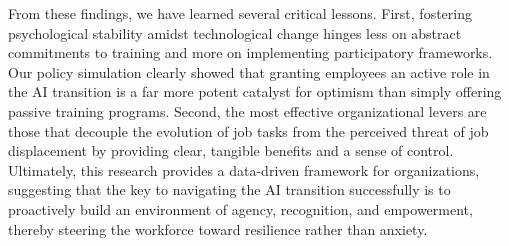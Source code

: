 \documentclass[]{article}
\begin{document}
From these findings, we have learned several critical lessons. First, fostering psychological stability amidst technological change hinges less on abstract commitments to training and more on implementing participatory frameworks. Our policy simulation clearly showed that granting employees an active role in the AI transition is a far more potent catalyst for optimism than simply offering passive training programs. Second, the most effective organizational levers are those that decouple the evolution of job tasks from the perceived threat of job displacement by providing clear, tangible benefits and a sense of control. Ultimately, this research provides a data-driven framework for organizations, suggesting that the key to navigating the AI transition successfully is to proactively build an environment of agency, recognition, and empowerment, thereby steering the workforce toward resilience rather than anxiety.


{}

\end{document}
